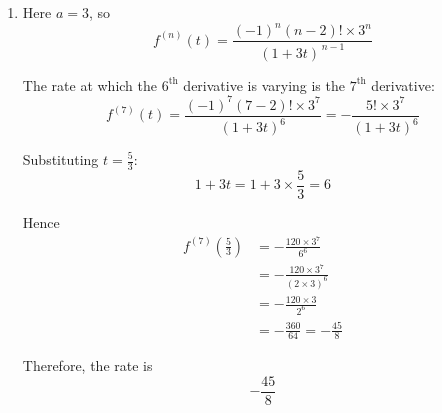 \documentclass[leqno]{article}
\begin{document}
\begin{enumerate}[
  label=\textbf{\arabic*.},
  leftmargin=*,
  topsep=0pt,
  partopsep=0pt,
  parsep=0pt
]
\begin{djsSolution}
\begin{enumerate}[label=\textbf{(\alph*)}]
  The formula gives
  \[
  \frac{(-1)^2(2-2)!a^2}{(1+at)^{2-1}}
  =\frac{1\times 0!\,a^2}{1+at}
  =\frac{a^2}{1+at}
  \]

  so the statement is true for \(n=2\).

  \textbf{Inductive hypothesis:} Assume the statement is true for \(n=k\), where \(k\ge 2\) is an integer. That is, assume
  \[
  f^{(k)}(t)=\frac{(-1)^k(k-2)!a^k}{(1+at)^{\,k-1}}
  \]

  \textbf{Inductive step:} Differentiate both sides:
  \begin{align*}
  f^{(k+1)}(t)
  &= \frac{\mathrm{d}}{\mathrm{d}t}\left[(-1)^k(k-2)!a^k(1+at)^{-(k-1)}\right] \\
  &= (-1)^k(k-2)!a^k \times \left(-(k-1)(1+at)^{-k}\times a\right) \\
  &= (-1)^{k+1}(k-1)(k-2)!a^{k+1}(1+at)^{-k} \\
  &= \frac{(-1)^{k+1}(k-1)!a^{k+1}}{(1+at)^k}
  \end{align*}

  Here
  \[
  (k+1)-2 = k-1
  \qquad \text{and} \qquad
  (k+1)-1 = k
  \]

  so the statement is true for \(n=k+1\).

  \textbf{Conclusion:} If the statement is true for \(n=k\), then it is true for \(n=k+1\). Since it is true for \(n=2\), by the principle of mathematical induction the statement is true for all integers \(n\ge 2\).

  \item Here \(a=3\), so
  \[
  f^{(n)}(t)=\frac{(-1)^n(n-2)!\times 3^n}{(1+3t)^{\,n-1}}
  \]

  The rate at which the \(6^\text{th}\) derivative is varying is the \(7^\text{th}\) derivative:
  \[
  f^{(7)}(t)=\frac{(-1)^7(7-2)!\times 3^7}{(1+3t)^6}
  =-\frac{5!\times 3^7}{(1+3t)^6}
  \]

  Substituting \(t=\frac{5}{3}\):
  \[
  1+3t=1+3\times\frac{5}{3}=6
  \]

  Hence
  \begin{align*}
  f^{(7)}\left(\frac{5}{3}\right)
  &= -\frac{120\times 3^7}{6^6} \\
  &= -\frac{120\times 3^7}{(2\times 3)^6} \\
  &= -\frac{120\times 3}{2^6} \\
  &= -\frac{360}{64}
  = -\frac{45}{8}
  \end{align*}

  Therefore, the rate is
  \[
  -\frac{45}{8}
  \]
\end{enumerate}
\end{djsSolution}



\end{enumerate}
\end{document}
